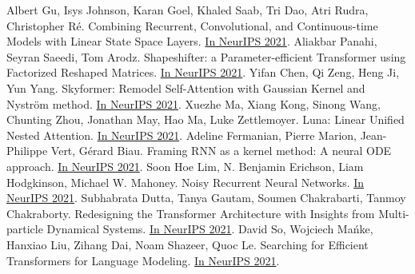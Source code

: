 \documentclass[b5paper,xelatex,ja=standard,10pt]{bxjsarticle}
\begin{document}
\begin{thebibliography}{99}
     Albert Gu, Isys Johnson, Karan Goel, Khaled Saab, Tri Dao, Atri Rudra, Christopher Ré. Combining Recurrent, Convolutional, and Continuous-time Models with Linear State Space Layers. {\href{https://proceedings.neurips.cc/paper/2021/hash/05546b0e38ab9175cd905eebcc6ebb76-Abstract.html}{In NeurIPS 2021}}.
     Aliakbar Panahi, Seyran Saeedi, Tom Arodz. Shapeshifter: a Parameter-efficient Transformer using Factorized Reshaped Matrices. {\href{https://proceedings.neurips.cc/paper/2021/hash/09def3ebbc44ff3426b28fcd88c83554-Abstract.html}{In NeurIPS 2021}}.
     Yifan Chen, Qi Zeng, Heng Ji, Yun Yang. Skyformer: Remodel Self-Attention with Gaussian Kernel and Nyström method. {\href{https://proceedings.neurips.cc/paper/2021/hash/10a7cdd970fe135cf4f7bb55c0e3b59f-Abstract.html}{In NeurIPS 2021}}.
     Xuezhe Ma, Xiang Kong, Sinong Wang, Chunting Zhou, Jonathan May, Hao Ma, Luke Zettlemoyer. Luna: Linear Unified Nested Attention. {\href{https://proceedings.neurips.cc/paper/2021/hash/14319d9cfc6123106878dc20b94fbaf3-Abstract.html}{In NeurIPS 2021}}.
     Adeline Fermanian, Pierre Marion, Jean-Philippe Vert, Gérard Biau. Framing RNN as a kernel method: A neural ODE approach. {\href{https://proceedings.neurips.cc/paper/2021/hash/18a9042b3fc5b02fe3d57fea87d6992f-Abstract.html}{In NeurIPS 2021}}.
     Soon Hoe Lim, N. Benjamin Erichson, Liam Hodgkinson, Michael W. Mahoney. Noisy Recurrent Neural Networks. {\href{https://proceedings.neurips.cc/paper/2021/hash/29301521774ff3cbd26652b2d5c95996-Abstract.html}{In NeurIPS 2021}}.
     Subhabrata Dutta, Tanya Gautam, Soumen Chakrabarti, Tanmoy Chakraborty. Redesigning the Transformer Architecture with Insights from Multi-particle Dynamical Systems. {\href{https://proceedings.neurips.cc/paper/2021/hash/2bd388f731f26312bfc0fe30da009595-Abstract.html}{In NeurIPS 2021}}.
     David So, Wojciech Mańke, Hanxiao Liu, Zihang Dai, Noam Shazeer, Quoc Le. Searching for Efficient Transformers for Language Modeling. {\href{https://proceedings.neurips.cc/paper/2021/hash/2f3c6a4cd8af177f6456e7e51a916ff3-Abstract.html}{In NeurIPS 2021}}.

\end{thebibliography}
\end{document}
